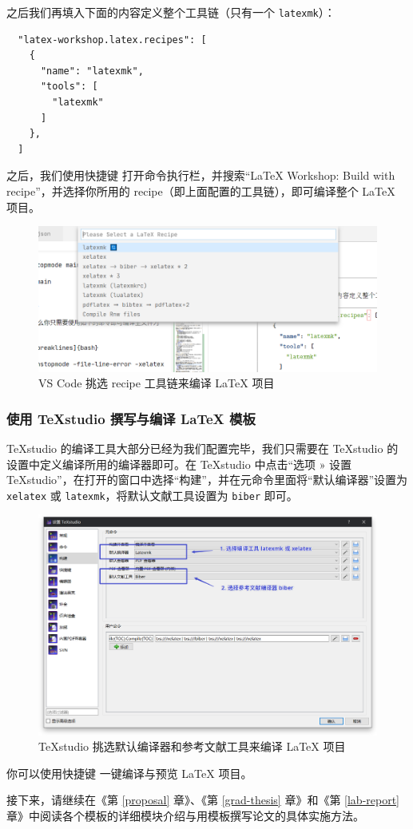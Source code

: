 之后我们再填入下面的内容定义整个工具链（只有一个 \texttt{latexmk}）：

\begin{verbatim}
  "latex-workshop.latex.recipes": [
    {
      "name": "latexmk",
      "tools": [
        "latexmk"
      ]
    },
  ]
\end{verbatim}

之后，我们使用快捷键  打开命令执行栏，并搜索“LaTeX Workshop: Build with recipe”，并选择你所用的 recipe（即上面配置的工具链），即可编译整个 {\LaTeX} 项目。

\begin{figure}[H]
  \centering
  \includegraphics[width=\textwidth]{images/vscode_build_recipe.png}
  \caption{VS Code 挑选 recipe 工具链来编译 {\LaTeX} 项目}
\end{figure}

\subsubsection{使用 \TeX studio 撰写与编译 {\LaTeX} 模板}

\TeX studio 的编译工具大部分已经为我们配置完毕，我们只需要在 \TeX studio 的设置中定义编译所用的编译器即可。在 \TeX studio 中点击“选项 » 设置 TeXstudio”，在打开的窗口中选择“构建”，并在元命令里面将“默认编译器”设置为 \texttt{xelatex} 或 \texttt{latexmk}，将默认文献工具设置为 \texttt{biber} 即可。

\begin{figure}[H]
  \centering
  \includegraphics[width=\textwidth]{images/texstudio_build.png}
  \caption{\TeX studio 挑选默认编译器和参考文献工具来编译 {\LaTeX} 项目}
\end{figure}

你可以使用快捷键  一键编译与预览 {\LaTeX} 项目。

接下来，请继续在《第 \ref{proposal} 章》、《第 \ref{grad-thesis} 章》和《第 \ref{lab-report} 章》中阅读各个模板的详细模块介绍与用模板撰写论文的具体实施方法。
